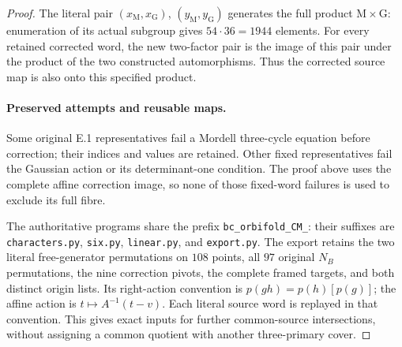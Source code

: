 \begin{proof}
The literal pair $(x_{\mathrm M},x_{\mathrm G})$,
$(y_{\mathrm M},y_{\mathrm G})$ generates the full
product $\mathrm M\times\mathrm G$: enumeration of
its actual subgroup gives $54\cdot36=1944$ elements.
For every retained corrected word, the new two-factor
pair is the image of this pair under the product of
the two constructed automorphisms. Thus the corrected
source map is also onto this specified product.

\paragraph{Preserved attempts and reusable maps.}
Some original E.1 representatives fail a Mordell
three-cycle equation before correction; their indices
and values are retained. Other fixed representatives
fail the Gaussian action or its determinant-one
condition. The proof above uses the complete affine
correction image, so none of those fixed-word failures
is used to exclude its full fibre.

The authoritative programs share the prefix
\texttt{bc\_orbifold\_CM\_}: their suffixes are
\texttt{characters.py}, \texttt{six.py},
\texttt{linear.py}, and \texttt{export.py}.
The export retains the two literal free-generator
permutations on $108$ points, all $97$ original
$N_B$ permutations, the nine correction pivots,
the complete framed targets, and both distinct
origin lists. Its right-action convention is
$p(gh)=p(h)[p(g)]$; the affine action is
$t\mapsto A^{-1}(t-v)$. Each literal source word
is replayed in that convention. This gives exact
inputs for further common-source intersections,
without assigning a common quotient with another
three-primary cover.
\end{proof}
